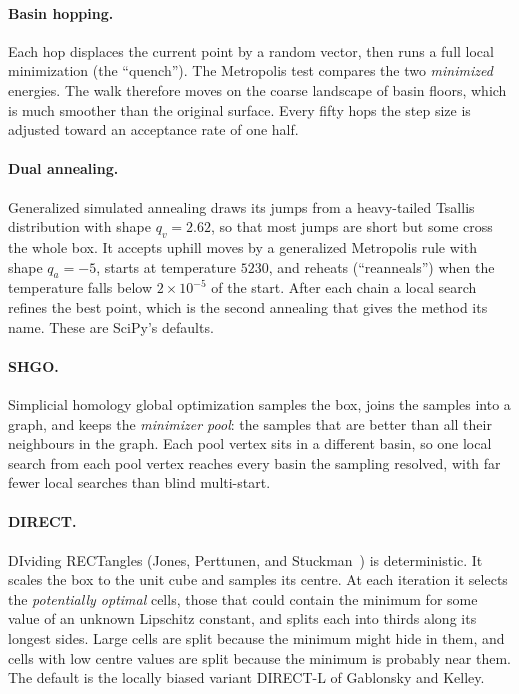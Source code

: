 \paragraph{Basin hopping.} Each hop displaces the current point by a random
vector, then runs a full local minimization (the ``quench''). The Metropolis
test compares the two \emph{minimized} energies.
The walk therefore moves on the coarse landscape of basin floors, which is much
smoother than the original surface. Every fifty hops the step size is adjusted
toward an acceptance rate of one half.

\paragraph{Dual annealing.} Generalized simulated annealing draws its jumps from
a heavy-tailed Tsallis distribution with shape \(q_v = 2.62\), so that most
jumps are short but some cross the whole box. It accepts uphill moves by a
generalized Metropolis rule with shape \(q_a = -5\), starts at temperature
\(5230\), and reheats (``reanneals'') when the temperature falls below
\(2\times10^{-5}\) of the start. After each chain a local search refines the
best point, which is the second annealing that gives the method its name.
These are SciPy's defaults.

\paragraph{SHGO.} Simplicial homology global optimization samples the box,
joins the samples into a graph, and keeps the \emph{minimizer pool}: the samples
that are better than all their neighbours in the graph. Each pool vertex sits in
a different basin, so one local search from each pool vertex reaches every
basin the sampling resolved, with far fewer local searches than blind
multi-start.

\paragraph{DIRECT.} DIviding RECTangles (Jones, Perttunen, and
Stuckman~\cite{direct}) is deterministic. It scales the box to the unit cube and
samples its centre. At each iteration it selects the \emph{potentially optimal}
cells, those that could contain the minimum for some value of an unknown
Lipschitz constant, and splits each into thirds along its longest sides.
Large cells are split because the minimum might hide in them, and cells with
low centre values are split because the minimum is probably near them. The
default is the locally biased variant DIRECT-L of Gablonsky and Kelley.

